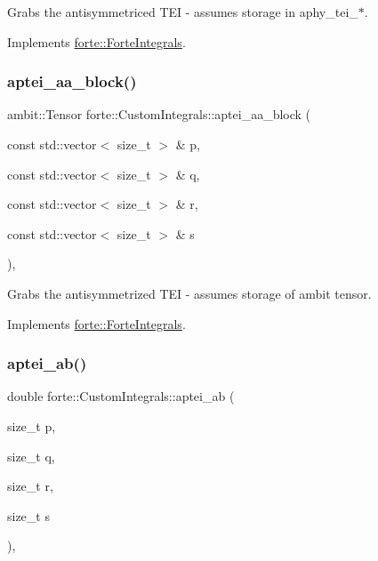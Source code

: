 Grabs the antisymmetriced T\+EI -\/ assumes storage in aphy\+\_\+tei\+\_\+$\ast$. 



Implements \mbox{\hyperlink{classforte_1_1_forte_integrals_afc84c157025b56ee0f8e3b1abe1c0a5f}{forte\+::\+Forte\+Integrals}}.

\mbox{\label{classforte_1_1_custom_integrals_ae60addb837588a5101f1f2485a818426}} 
\subsubsection{\texorpdfstring{aptei\+\_\+aa\+\_\+block()}{aptei\_aa\_block()}}
{\footnotesize\ttfamily ambit\+::\+Tensor forte\+::\+Custom\+Integrals\+::aptei\+\_\+aa\+\_\+block (\begin{DoxyParamCaption}\item[{const std\+::vector$<$ size\+\_\+t $>$ \&}]{p,  }\item[{const std\+::vector$<$ size\+\_\+t $>$ \&}]{q,  }\item[{const std\+::vector$<$ size\+\_\+t $>$ \&}]{r,  }\item[{const std\+::vector$<$ size\+\_\+t $>$ \&}]{s }\end{DoxyParamCaption})\hspace{0.3cm}{\ttfamily [override]}, {\ttfamily [virtual]}}



Grabs the antisymmetrized T\+EI -\/ assumes storage of ambit tensor. 



Implements \mbox{\hyperlink{classforte_1_1_forte_integrals_ac20ae649b8cfe116f8583d676e43da27}{forte\+::\+Forte\+Integrals}}.

\mbox{\label{classforte_1_1_custom_integrals_abfea37dad8b705e35732f3fae06dd151}} 
\subsubsection{\texorpdfstring{aptei\+\_\+ab()}{aptei\_ab()}}
{\footnotesize\ttfamily double forte\+::\+Custom\+Integrals\+::aptei\+\_\+ab (\begin{DoxyParamCaption}\item[{size\+\_\+t}]{p,  }\item[{size\+\_\+t}]{q,  }\item[{size\+\_\+t}]{r,  }\item[{size\+\_\+t}]{s }\end{DoxyParamCaption})\hspace{0.3cm}{\ttfamily [override]}, {\ttfamily [virtual]}}



